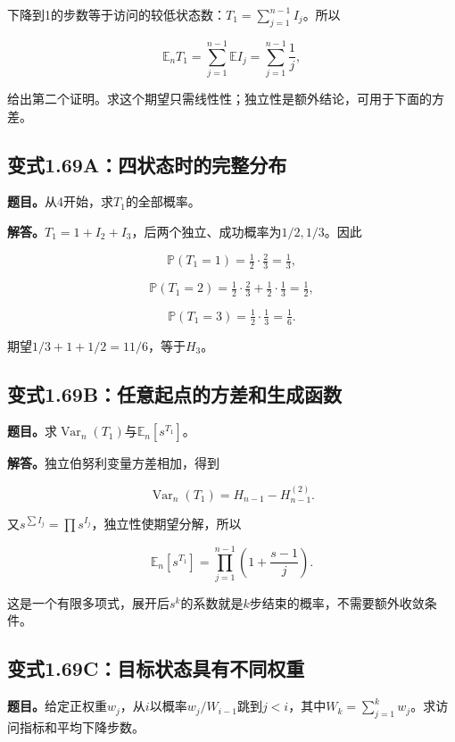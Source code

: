 \documentclass[
  11pt,a4paper,UTF8,fontset=fandol]{ctexart}
\begin{document}
下降到1的步数等于访问的较低状态数：\(T_1=\sum_{j=1}^{n-1}I_j\)。所以

\[\mathbb E_nT_1=\sum_{j=1}^{n-1}\mathbb EI_j=\sum_{j=1}^{n-1}\frac1j,\]

给出第二个证明。求这个期望只需线性性；独立性是额外结论，可用于下面的方差。

\subsection{变式1.69A：四状态时的完整分布}\label{ux53d8ux5f0f1.69aux56dbux72b6ux6001ux65f6ux7684ux5b8cux6574ux5206ux5e03}

\textbf{题目。}从4开始，求\(T_1\)的全部概率。

\textbf{解答。}\(T_1=1+I_2+I_3\)，后两个独立、成功概率为\(1/2,1/3\)。因此

\[\mathbb P(T_1=1)=\tfrac12\cdot\tfrac23=\tfrac13,\]

\[\mathbb P(T_1=2)=\tfrac12\cdot\tfrac23+\tfrac12\cdot\tfrac13=\tfrac12,\]

\[\mathbb P(T_1=3)=\tfrac12\cdot\tfrac13=\tfrac16.\]

期望\(1/3+1+1/2=11/6\)，等于\(H_3\)。

\subsection{变式1.69B：任意起点的方差和生成函数}\label{ux53d8ux5f0f1.69bux4efbux610fux8d77ux70b9ux7684ux65b9ux5deeux548cux751fux6210ux51fdux6570}

\textbf{题目。}求\(\operatorname{Var}_n(T_1)\)与\(\mathbb E_n[s^{T_1}]\)。

\textbf{解答。}独立伯努利变量方差相加，得到

\[\boxed{\operatorname{Var}_n(T_1)=H_{n-1}-H_{n-1}^{(2)}.}\]

又\(s^{\sum I_j}=\prod s^{I_j}\)，独立性使期望分解，所以

\[\boxed{\mathbb E_n[s^{T_1}]=\prod_{j=1}^{n-1}\left(1+\frac{s-1}{j}\right).}\]

这是一个有限多项式，展开后\(s^k\)的系数就是\(k\)步结束的概率，不需要额外收敛条件。

\subsection{变式1.69C：目标状态具有不同权重}\label{ux53d8ux5f0f1.69cux76eeux6807ux72b6ux6001ux5177ux6709ux4e0dux540cux6743ux91cd}

\textbf{题目。}给定正权重\(w_j\)，从\(i\)以概率\(w_j/W_{i-1}\)跳到\(j<i\)，其中\(W_k=\sum_{j=1}^kw_j\)。求访问指标和平均下降步数。
\end{document}
